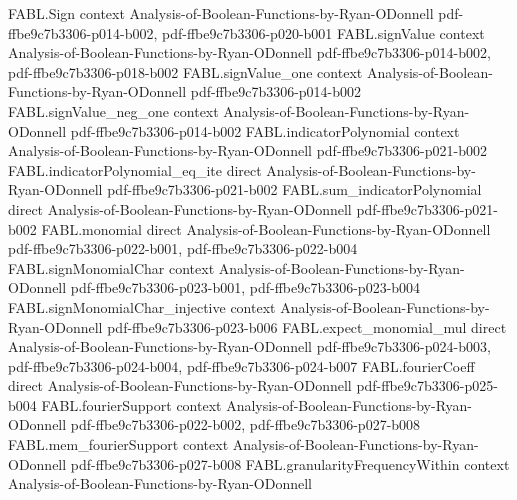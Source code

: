\begin{theorem}
\label{FABL.fourierCoeff_middleLayerIndicator}
\leanok
{}
\proofstep
  {FABL.Sign}
  {context}
  {Analysis-of-Boolean-Functions-by-Ryan-ODonnell}
  {pdf-ffbe9c7b3306-p014-b002,
    pdf-ffbe9c7b3306-p020-b001}
\proofstep
  {FABL.signValue}
  {context}
  {Analysis-of-Boolean-Functions-by-Ryan-ODonnell}
  {pdf-ffbe9c7b3306-p014-b002,
    pdf-ffbe9c7b3306-p018-b002}
\proofstep
  {FABL.signValue_one}
  {context}
  {Analysis-of-Boolean-Functions-by-Ryan-ODonnell}
  {pdf-ffbe9c7b3306-p014-b002}
\proofstep
  {FABL.signValue_neg_one}
  {context}
  {Analysis-of-Boolean-Functions-by-Ryan-ODonnell}
  {pdf-ffbe9c7b3306-p014-b002}
\proofstep
  {FABL.indicatorPolynomial}
  {context}
  {Analysis-of-Boolean-Functions-by-Ryan-ODonnell}
  {pdf-ffbe9c7b3306-p021-b002}
\proofstep
  {FABL.indicatorPolynomial_eq_ite}
  {direct}
  {Analysis-of-Boolean-Functions-by-Ryan-ODonnell}
  {pdf-ffbe9c7b3306-p021-b002}
\proofstep
  {FABL.sum_indicatorPolynomial}
  {direct}
  {Analysis-of-Boolean-Functions-by-Ryan-ODonnell}
  {pdf-ffbe9c7b3306-p021-b002}
\proofstep
  {FABL.monomial}
  {direct}
  {Analysis-of-Boolean-Functions-by-Ryan-ODonnell}
  {pdf-ffbe9c7b3306-p022-b001,
    pdf-ffbe9c7b3306-p022-b004}
\proofstep
  {FABL.signMonomialChar}
  {context}
  {Analysis-of-Boolean-Functions-by-Ryan-ODonnell}
  {pdf-ffbe9c7b3306-p023-b001,
    pdf-ffbe9c7b3306-p023-b004}
\proofstep
  {FABL.signMonomialChar_injective}
  {context}
  {Analysis-of-Boolean-Functions-by-Ryan-ODonnell}
  {pdf-ffbe9c7b3306-p023-b006}
\proofstep
  {FABL.expect_monomial_mul}
  {direct}
  {Analysis-of-Boolean-Functions-by-Ryan-ODonnell}
  {pdf-ffbe9c7b3306-p024-b003,
    pdf-ffbe9c7b3306-p024-b004,
    pdf-ffbe9c7b3306-p024-b007}
\proofstep
  {FABL.fourierCoeff}
  {direct}
  {Analysis-of-Boolean-Functions-by-Ryan-ODonnell}
  {pdf-ffbe9c7b3306-p025-b004}
\proofstep
  {FABL.fourierSupport}
  {context}
  {Analysis-of-Boolean-Functions-by-Ryan-ODonnell}
  {pdf-ffbe9c7b3306-p022-b002,
    pdf-ffbe9c7b3306-p027-b008}
\proofstep
  {FABL.mem_fourierSupport}
  {context}
  {Analysis-of-Boolean-Functions-by-Ryan-ODonnell}
  {pdf-ffbe9c7b3306-p027-b008}
\proofstep
  {FABL.granularityFrequencyWithin}
  {context}
  {Analysis-of-Boolean-Functions-by-Ryan-ODonnell}

\end{theorem}
